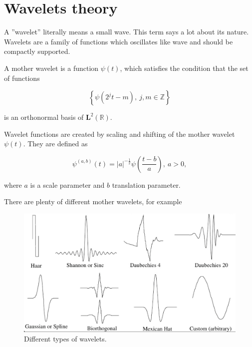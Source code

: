 \chapter{Wavelets theory}
\label{ch:theory}
A ''wavelet'' literally means a small wave. This term says a lot about its nature. Wavelets are a family of functions which oscillates like wave and should be compactly supported.

\begin{defn}
A mother wavelet is a function $\psi(t)$, which satisfies the condition that the set of functions

\begin{equation}
\left\{\psi(2^j t-m),\ j,m\in\mathbb{Z}\right\}
\end{equation}

is an orthonormal basis of $\mathbf{L}^2(\mathbb{R})$.
\end{defn}

\begin{defn}
Wavelet functions are created by scaling and shifting of the mother wavelet $\psi(t)$. They are defined as

\begin{equation}
\label{eq:wavelets}
\psi^{(a,b)}(t)=|a|^{-\frac{1}{2}} \psi\left(\frac{t-b}{a}\right),\ a>0,
\end{equation}

where $a$ is a scale parameter and $b$ translation parameter.
\end{defn}

There are plenty of different mother wavelets, for example

\begin{figure}[h]
	\centering
	\includegraphics[width=\textwidth]{wavelets_with_bottom_line.png}
	\caption{Different types of wavelets.}
	\label{fig:wavelets}
\end{figure}

